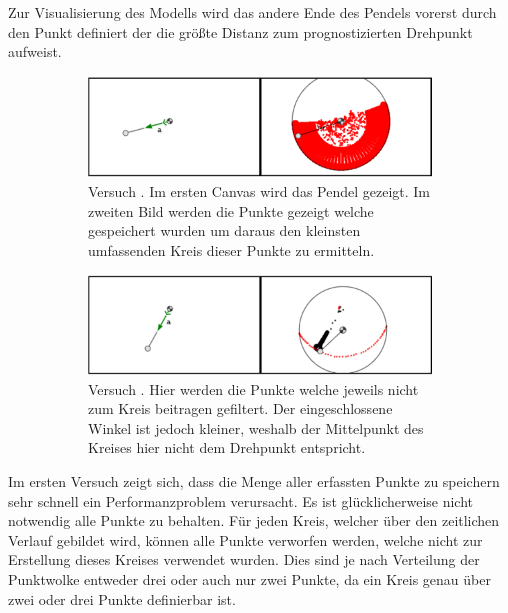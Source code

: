 Zur Visualisierung des Modells wird das andere Ende des Pendels vorerst durch den Punkt definiert der die grö{\ss}te Distanz zum prognostizierten Drehpunkt aufweist.

\begin{figure}
    \centering
    \begin{subfigure}[t]{0.45\textwidth}
        \includegraphics[width=\textwidth]{gfx/pendel1_1.png}
        \caption{Versuch . Im ersten Canvas wird das Pendel gezeigt. Im zweiten Bild werden die Punkte gezeigt welche gespeichert wurden um daraus den kleinsten umfassenden Kreis dieser Punkte zu ermitteln.}\label{fig:pendel1_1}
    \end{subfigure}
    \begin{subfigure}[t]{0.45\textwidth}
        \includegraphics[width=\textwidth]{gfx/pendel1_2.png}
        \caption{Versuch . Hier werden die Punkte welche jeweils nicht zum Kreis beitragen gefiltert. Der eingeschlossene Winkel ist jedoch kleiner, weshalb der Mittelpunkt des Kreises hier nicht dem Drehpunkt entspricht.}\label{fig:pendel1_2}
    \end{subfigure}
    \caption[Versuche  und ]{}
    \label{fig:pendel1_1_2}
\end{figure}

Im ersten Versuch zeigt sich, dass die Menge aller erfassten Punkte zu speichern sehr schnell ein Performanzproblem verursacht.
Es ist glücklicherweise nicht notwendig alle Punkte zu behalten.
Für jeden Kreis, welcher über den zeitlichen Verlauf gebildet wird, können alle Punkte verworfen werden, welche nicht zur Erstellung dieses Kreises verwendet wurden.
Dies sind je nach Verteilung der Punktwolke entweder drei oder auch nur zwei Punkte, da ein Kreis genau über zwei oder drei Punkte definierbar ist.

